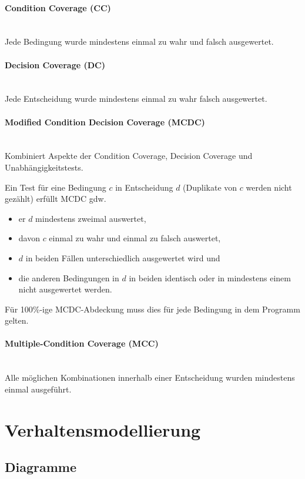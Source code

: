 \documentclass[ngerman]{tuda_summary}
\begin{document}
\paragraph{Condition Coverage (CC)}\mbox{}\\
Jede Bedingung wurde mindestens einmal zu wahr und falsch ausgewertet.

\paragraph{Decision Coverage (DC)}\mbox{}\\
Jede Entscheidung wurde mindestens einmal zu wahr falsch ausgewertet.

\paragraph{Modified Condition Decision Coverage (MCDC)}\mbox{}\\
Kombiniert Aspekte der Condition Coverage, Decision Coverage und Unabhängigkeitstests.

Ein Test für eine Bedingung $ c $ in Entscheidung $ d $ (Duplikate von $ c $ werden nicht gezählt) erfüllt MCDC gdw.
\begin{itemize}
    \item er $ d $ mindestens zweimal auswertet,
    \item davon $ c $ einmal zu wahr und einmal zu falsch auswertet,
    \item $ d $ in beiden Fällen unterschiedlich ausgewertet wird und
    \item die anderen Bedingungen in $ d $ in beiden identisch oder in mindestens einem nicht ausgewertet werden.
\end{itemize}
Für 100\%-ige MCDC-Abdeckung muss dies für jede Bedingung in dem Programm gelten.

\paragraph{Multiple-Condition Coverage (MCC)}\mbox{}\\
Alle möglichen Kombinationen innerhalb einer Entscheidung wurden mindestens einmal ausgeführt.
\clearpage
\section{Verhaltensmodellierung}
\subsection{Diagramme}
\end{document}
